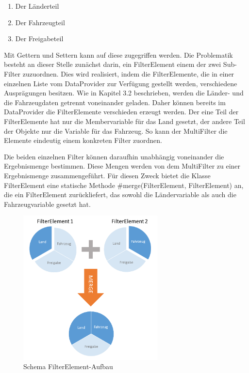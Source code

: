 \begin{enumerate}
	\item Der Länderteil
	\item Der Fahrzeugteil
	\item Der Freigabeteil
\end{enumerate}

Mit Gettern und Settern kann auf diese zugegriffen werden. Die Problematik besteht an dieser Stelle zunächst darin, ein FilterElement einem der zwei Sub-Filter zuzuordnen. Dies wird realisiert, indem die FilterElemente, die in einer einzelnen Liste vom DataProvider zur Verfügung gestellt werden, verschiedene Ausprägungen besitzen. Wie in Kapitel 3.2 beschrieben, werden die Länder- und die Fahrzeugdaten getrennt voneinander geladen. Daher können bereits im DataProvider die FilterElemente verschieden erzeugt werden. Der eine Teil der FilterElemente hat nur die Membervariable für das Land gesetzt, der andere Teil der Objekte nur die Variable für das Fahrzeug. So kann der MultiFilter die Elemente eindeutig einem konkreten Filter zuordnen.

Die beiden einzelnen Filter können daraufhin unabhängig voneinander die Ergebnismenge bestimmen. Diese Mengen werden von dem MultiFilter zu einer Ergebnismenge zusammengeführt. Für diesen Zweck bietet die Klasse FilterElement eine statische Methode \#merge(FilterElement, FilterElement) an, die ein FilterElement zurückliefert, das sowohl die Ländervariable als auch die Fahrzeugvariable gesetzt hat.

\begin{figure}[H]
 \centering
 \includegraphics[width=0.65\textwidth]{grafiken/Multi_FilterElement.png}
 \caption{Schema FilterElement-Aufbau}
 \label{fig:multiFilter3}
\end{figure}

